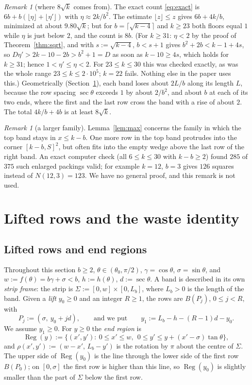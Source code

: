 \documentclass[11pt]{amsart}
\newcommand{\Reg}{\operatorname{Reg}}
\theoremstyle{definition}
\theoremstyle{remark}
\newtheorem{remark}[theorem]{Remark}
\numberwithin{equation}{section}
\begin{document}
\begin{remark}[where $8\sqrt k$ comes from]\label{rem:eight}
The exact count \eqref{eq:exact} is $6b+b(\lfloor\eta\rfloor+\lfloor\eta'\rfloor)$ with $\eta\approx2k/b^2$. The
estimate $\lfloor z\rfloor\le z$ gives $6b+4k/b$, minimized at about $9.80\sqrt k$; but for $b=\lceil\sqrt{k-4}\rceil$ and
$k\ge23$ both floors equal $1$ while $\eta$ is just below $2$, and the count is $8b$. (For $k\ge31$: $\eta<2$ by the
proof of Theorem~\ref{thm:sqrt}, and with $s:=\sqrt{k-4}$, $b<s+1$ gives $b^2+2b<k-1+4s$, so
$D\eta'>2k-10-2b>b^2+1=D$ as soon as $k-10\ge4s$, which holds for $k\ge31$; hence $1<\eta'\le\eta<2$. For
$23\le k\le30$ this was checked exactly, as was the whole range $23\le k\le2\cdot10^5$; $k=22$ fails. Nothing
else in the paper uses this.) Geometrically (Section~\ref{sec:ends}),
each band loses about $2L/b$ along its length $L$, because the row spacing $\sec\theta$ exceeds $1$ by about $2/b^2$,
and about $b$ at each of its two ends, where the first and the last row cross the band with a rise of about $2$. The
total $4k/b+4b$ is at least $8\sqrt k$.
\end{remark}

\begin{remark}[a larger family]\label{rem:extra}
Lemma~\ref{lem:max} concerns the family in which the top band stays in $x\le k-b$. One more row in the top band
protrudes into the corner $[k-b,S]^2$, but often fits into the empty wedge above the last row of the right band. An
exact computer check (all $6\le k\le30$ with $k-b\ge2$) found $285$ of $375$ such enlarged packings valid; for example
$k=12$, $b=3$ gives $126$ squares instead of $N(12,3)=123$. We have no general proof, and this remark is not used.
\end{remark}

\section{Lifted rows and the waste identity}\label{sec:ends}

\subsection{Lifted rows and end regions}\label{ssec:frame}
Throughout this section $b\ge2$, $\theta\in(\theta_0,\pi/2)$, $\gamma=\cos\theta$, $\sigma=\sin\theta$, and
$w:=f(\theta)=b\gamma+\sigma<b$, $h:=h(\theta)$, $d:=\sec\theta$. A band is described in its own \emph{strip frame}: the
strip is $\Sigma:=[0,w]\times[0,L_b]$, where $L_b>0$ is the length of the band. Given a \emph{lift} $y_0\ge0$ and an
integer $R\ge1$, the rows are $B(P_j)$, $0\le j<R$, with
\[
P_j:=(\sigma,\ y_0+jd),\qquad\text{and we put}\qquad y_1:=L_b-h-(R-1)d-y_0 .
\]
We assume $y_1\ge0$. For $y\ge0$ the \emph{end region} is
\[
\Reg(y):=\{(x',y'):\ 0\le x'\le w,\ \ 0\le y'\le y+(x'-\sigma)\tan\theta\},
\]
and $\rho(x',y'):=(w-x',\,L_b-y')$ is the rotation by $\pi$ about the centre of $\Sigma$. The upper side of $\Reg(y_0)$
is the line through the lower side of the first row $B(P_0)$; on $[0,\sigma]$ the first row is higher than this line,
so $\Reg(y_0)$ is slightly smaller than the part of $\Sigma$ below the first row.
\end{document}
